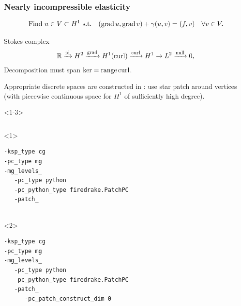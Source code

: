 \documentclass[presentation,aspectratio=43, 10pt]{beamer}
\DeclareMathOperator{\grad}{grad}
\let\div\relax
\DeclareMathOperator{\div}{div}
\DeclareMathOperator{\curl}{curl}
\DeclareMathOperator{\range}{range}
\begin{document}
\begin{frame}[fragile,t]
  \frametitle{Nearly incompressible elasticity}
  \vspace*{-1.5\baselineskip}
  \begin{equation*}
    \text{Find $u \in V \subset H^1$ s.t.} \quad (\grad u, \grad v) + \gamma (\div u, \div v) = (f, v) \quad \forall v \in V.
  \end{equation*}
  \vspace*{-\baselineskip}
  \begin{block}{Stokes complex}
    \begin{equation*}
      \mathbb{R} \xrightarrow{\operatorname{id}} H^2 \xrightarrow{\grad} H^1(\curl)
      \xrightarrow{\curl} H^1 \xrightarrow{\div} L^2 \xrightarrow{\operatorname{null}} 0,
    \end{equation*}
    Decomposition must span $\ker \div = \range \curl$.

    Appropriate discrete spaces are constructed in \textcite{Neilan:2015a}: use
    star patch around vertices (with piecewise continuous space for
    $H^1$ of sufficiently high degree).
  \end{block}
  \begin{onlyenv}<1-3>
    \begin{columns}
      \begin{column}{0.6\textwidth}
        \begin{onlyenv}<1>
\begin{verbatim}
-ksp_type cg
-pc_type mg
-mg_levels_
   -pc_type python
   -pc_python_type firedrake.PatchPC
   -patch_


\end{verbatim}
        \end{onlyenv}
        \begin{onlyenv}<2>
\begin{verbatim}
-ksp_type cg
-pc_type mg
-mg_levels_
   -pc_type python
   -pc_python_type firedrake.PatchPC
   -patch_
      -pc_patch_construct_dim 0


\end{verbatim}
\end{onlyenv}
\end{column}
\end{columns}
\end{onlyenv}
\end{frame}
\end{document}
